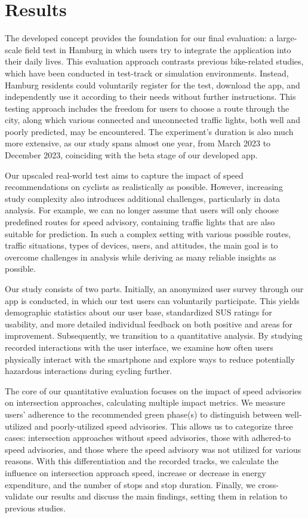 \section{Results}

The developed concept provides the foundation for our final evaluation: a large-scale field test in Hamburg in which users try to integrate the application into their daily lives. This evaluation approach contrasts previous bike-related studies, which have been conducted in test-track or simulation environments. Instead, Hamburg residents could voluntarily register for the test, download the app, and independently use it according to their needs without further instructions. This testing approach includes the freedom for users to choose a route through the city, along which various connected and unconnected traffic lights, both well and poorly predicted, may be encountered. The experiment's duration is also much more extensive, as our study spans almost one year, from March 2023 to December 2023, coinciding with the beta stage of our developed app.

Our upscaled real-world test aims to capture the impact of speed recommendations on cyclists as realistically as possible. However, increasing study complexity also introduces additional challenges, particularly in data analysis. For example, we can no longer assume that users will only choose predefined routes for speed advisory, containing traffic lights that are also suitable for prediction. In such a complex setting with various possible routes, traffic situations, types of devices, users, and attitudes, the main goal is to overcome challenges in analysis while deriving as many reliable insights as possible. 

Our study consists of two parts. Initially, an anonymized user survey through our app is conducted, in which our test users can voluntarily participate. This yields demographic statistics about our user base, standardized SUS ratings for usability, and more detailed individual feedback on both positive and areas for improvement. Subsequently, we transition to a quantitative analysis. By studying recorded interactions with the user interface, we examine how often users physically interact with the smartphone and explore ways to reduce potentially hazardous interactions during cycling further.

The core of our quantitative evaluation focuses on the impact of speed advisories on intersection approaches, calculating multiple impact metrics. We measure users' adherence to the recommended green phase(s) to distinguish between well-utilized and poorly-utilized speed advisories. This allows us to categorize three cases: intersection approaches without speed advisories, those with adhered-to speed advisories, and those where the speed advisory was not utilized for various reasons. With this differentiation and the recorded tracks, we calculate the influence on intersection approach speed, increase or decrease in energy expenditure, and the number of stops and stop duration. Finally, we cross-validate our results and discuss the main findings, setting them in relation to previous studies.

